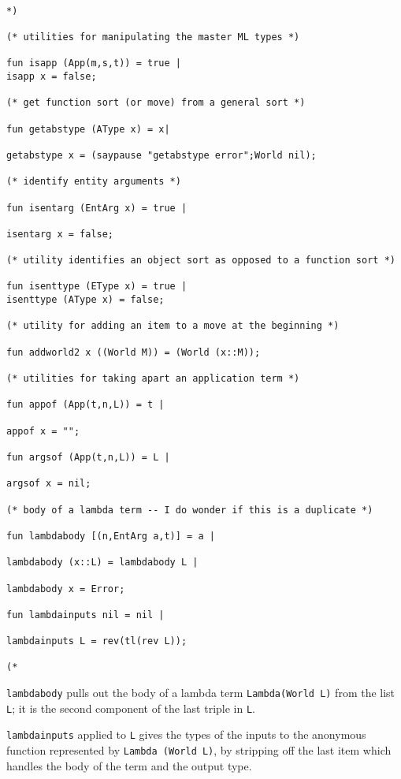 \documentclass{article}
\begin{document}
\begin{verbatim}

*)

(* utilities for manipulating the master ML types *)

fun isapp (App(m,s,t)) = true |
isapp x = false;

(* get function sort (or move) from a general sort *)

fun getabstype (AType x) = x|

getabstype x = (saypause "getabstype error";World nil);

(* identify entity arguments *)

fun isentarg (EntArg x) = true |

isentarg x = false;

(* utility identifies an object sort as opposed to a function sort *)

fun isenttype (EType x) = true |
isenttype (AType x) = false;

(* utility for adding an item to a move at the beginning *)

fun addworld2 x ((World M)) = (World (x::M));

(* utilities for taking apart an application term *)

fun appof (App(t,n,L)) = t |

appof x = "";

fun argsof (App(t,n,L)) = L |

argsof x = nil;

(* body of a lambda term -- I do wonder if this is a duplicate *)

fun lambdabody [(n,EntArg a,t)] = a |

lambdabody (x::L) = lambdabody L |

lambdabody x = Error;

fun lambdainputs nil = nil |

lambdainputs L = rev(tl(rev L));

(*

\end{verbatim}

{\tt lambdabody} pulls out the body of a lambda term {\tt Lambda(World L)} from the list {\tt L};  it is the second component of the last triple in {\tt L}.

{\tt lambdainputs} applied to {\tt L} gives the types of the inputs to the anonymous function
represented by {\tt Lambda (World L)}, by stripping off the last item which handles the body of the term and the output type.
\end{document}
